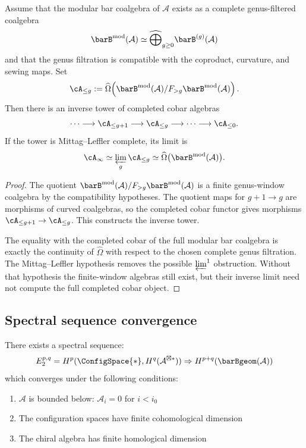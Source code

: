 \begin{theorem}\label{thm:universal-extension-tower}
Assume that the modular bar coalgebra of $\mathcal A$ exists as a
complete genus-filtered coalgebra
\[
\barB^{\mathrm{mod}}(\mathcal A)
\simeq \widehat{\bigoplus}_{g\ge0}\barB^{(g)}(\mathcal A)
\]
and that the genus filtration is compatible with the coproduct,
curvature, and sewing maps. Set
\[
\cA_{\le g}:=
\widehat\Omega\!\left(
\barB^{\mathrm{mod}}(\mathcal A)/F_{>g}\barB^{\mathrm{mod}}(\mathcal A)
\right).
\]
Then there is an inverse tower of completed cobar algebras
\[
\cdots\longrightarrow
\cA_{\le g+1}\longrightarrow
\cA_{\le g}\longrightarrow\cdots\longrightarrow\cA_{\le0}.
\]
If the tower is Mittag--Leffler complete, its limit is
\[
\cA_\infty\simeq
\varprojlim_g \cA_{\le g}
\simeq
\widehat\Omega\bigl(\barB^{\mathrm{mod}}(\mathcal A)\bigr).
\]
\end{theorem}

\begin{proof}
The quotient
$\barB^{\mathrm{mod}}(\mathcal A)/F_{>g}\barB^{\mathrm{mod}}(\mathcal A)$
is a finite genus-window coalgebra by the compatibility hypotheses.
The quotient maps for $g+1\to g$ are morphisms of curved coalgebras, so
the completed cobar functor gives morphisms
$\cA_{\le g+1}\to\cA_{\le g}$. This constructs the inverse tower.

The equality with the completed cobar of the full modular bar coalgebra
is exactly the continuity of $\widehat\Omega$ with respect to the
chosen complete genus filtration. The Mittag--Leffler hypothesis removes
the possible $\varprojlim^1$ obstruction. Without that hypothesis the
finite-window algebras still exist, but their inverse limit need not
compute the full completed cobar object.
\end{proof}

\subsection{Spectral sequence convergence}

\begin{theorem}
\label{thm:bar-complex-spectral-sequence}
There exists a spectral sequence:
\[E_2^{p,q} = H^p(\ConfigSpace{*}, H^q(\mathcal{A}^{\boxtimes *})) \Rightarrow H^{p+q}(\barBgeom(\mathcal{A}))\]
which converges under the following conditions:
\begin{enumerate}
\item $\mathcal{A}$ is bounded below: $\mathcal{A}_i = 0$ for $i < i_0$
\item The configuration spaces have finite cohomological dimension
\item The chiral algebra has finite homological dimension
\end{enumerate}
\end{theorem}


